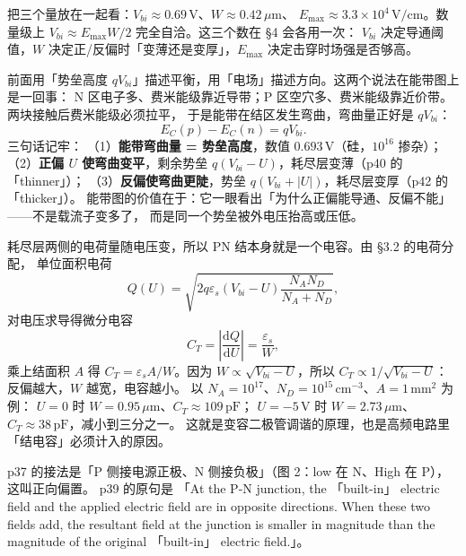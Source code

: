 \documentclass[11pt]{ctexart}
\begin{document}

把三个量放在一起看：$V_{bi}\approx0.69\,\mathrm{V}$、$W\approx0.42\,\mu\mathrm{m}$、
$E_{\max}\approx3.3\times10^{4}\,\mathrm{V/cm}$。数量级上
$V_{bi}\approx E_{\max}W/2$ 完全自洽。这三个数在 §4 会各用一次：
$V_{bi}$ 决定导通阈值，$W$ 决定正/反偏时「变薄还是变厚」，$E_{\max}$ 决定击穿时场强是否够高。


前面用「势垒高度 $qV_{bi}$」描述平衡，用「电场」描述方向。这两个说法在能带图上是一回事：
N 区电子多、费米能级靠近导带；P 区空穴多、费米能级靠近价带。两块接触后费米能级必须拉平，
于是能带在结区发生弯曲，弯曲量正好是 $qV_{bi}$：
\[
E_{C}(p)-E_{C}(n)=qV_{bi}.
\]
三句话记牢：
（1）\textbf{能带弯曲量 = 势垒高度}，数值 $0.693\,\mathrm{V}$（硅，$10^{16}$ 掺杂）；
（2）\textbf{正偏 $U$ 使弯曲变平}，剩余势垒 $q(V_{bi}-U)$，耗尽层变薄（p40 的 「thinner」）；
（3）\textbf{反偏使弯曲更陡}，势垒 $q(V_{bi}+|U|)$，耗尽层变厚（p42 的 「thicker」）。
能带图的价值在于：它一眼看出「为什么正偏能导通、反偏不能」——不是载流子变多了，
而是同一个势垒被外电压抬高或压低。


耗尽层两侧的电荷量随电压变，所以 PN 结本身就是一个电容。由 §3.2 的电荷分配，
单位面积电荷
\[
Q(U)=\sqrt{2q\varepsilon_s\left(V_{bi}-U\right)\frac{N_AN_D}{N_A+N_D}},
\]
对电压求导得微分电容
\[
C_T=\left|\frac{\mathrm{d}Q}{\mathrm{d}U}\right|=\frac{\varepsilon_s}{W},
\]
乘上结面积 $A$ 得 $C_T=\varepsilon_sA/W$。因为 $W\propto\sqrt{V_{bi}-U}$，所以
$C_T\propto1/\sqrt{V_{bi}-U}$：反偏越大，$W$ 越宽，电容越小。
以 $N_A=10^{17}$、$N_D=10^{15}\,\mathrm{cm^{-3}}$、$A=1\,\mathrm{mm^2}$ 为例：
$U=0$ 时 $W=0.95\,\mu\mathrm{m}$、$C_T\approx109\,\mathrm{pF}$；
$U=-5\,\mathrm{V}$ 时 $W=2.73\,\mu\mathrm{m}$、$C_T\approx38\,\mathrm{pF}$，减小到三分之一。
这就是变容二极管调谐的原理，也是高频电路里「结电容」必须计入的原因。



p37 的接法是「P 侧接电源正极、N 侧接负极」（图 2：low 在 N、High 在 P），这叫正向偏置。
p39 的原句是 「At the P-N junction, the 「built-in」 electric field and the applied electric field
are in opposite directions. When these two fields add, the resultant field at the junction is
smaller in magnitude than the magnitude of the original 「built-in」 electric field.」。
\end{document}
